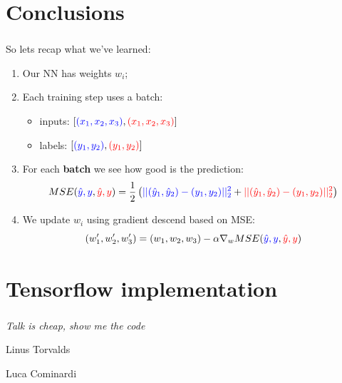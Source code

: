 \documentclass{beamer}
\begin{document}
\section{Conclusions}
\begin{frame}
    \frametitle{\insertsection}
    So lets recap what we've learned:
    \begin{enumerate}
        \item<1-> Our NN has weights $w_i$;
        \item<2-> Each training step uses a batch:
            \begin{itemize}
                \item inputs: $[{\color{blue}(x_1,x_2,x_3)}, {\color{red}(x_1,x_2,x_3)}]$
                \item labels: $[{\color{blue}(y_1,y_2)}, {\color{red}(y_1,y_2)}]$
            \end{itemize}
        \item<3-> For each \textbf{batch} we see how good is the prediction:
            \begin{equation*}
                MSE({\color{blue} \hat{y},y},{\color{red} \hat{y},y})= \frac{1}{2}\left( {\color{blue} || (\hat{y}_1, \hat{y}_2) - (y_1,y_2) ||_2^2} + {\color{red}|| (\hat{y}_1, \hat{y}_2) - (y_1,y_2) ||_2^2 } \right)
            \end{equation*}
        \item<4-> We update $w_i$ using gradient descend based on MSE:
            \begin{equation*}
                (w_1',w_2',w_3') = (w_1,w_2,w_3) - \alpha \nabla_w MSE({\color{blue} \hat{y},y},{\color{red} \hat{y},y})
            \end{equation*}
    \end{enumerate}
\end{frame}


\section{Tensorflow implementation}
\begin{frame}[fragile]
    \frametitle{\insertsection}
    \vfill

    \textit{Talk is cheap, show me the code}

    \hfill Linus Torvalds

    {\hfill Luca Cominardi
    }
    \vfill
\end{frame}
\end{document}
